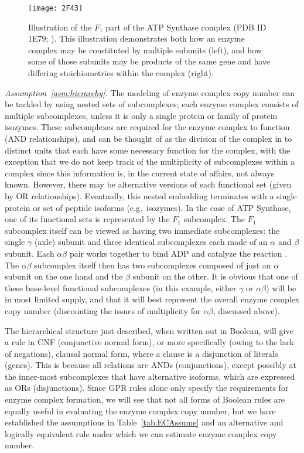 \begin{figure*}%
\centering
\texttt{[image: 2F43]}
\caption{Illustration of the $F_1$ part of the ATP Synthase complex
  (PDB ID 1E79; \citealt{Gibbons2000,Bernstein1978,Gezelter}).
  This illustration demonstrates both how an enzyme complex may be
  constituted by multiple subunits (left), and how some of those
  subunits may be products of the same gene and have differing
  stoichiometries within the complex (right).}
\label{fig:2F43}
\end{figure*}

\emph{Assumption~\ref{asm:hierarchy}.}
The modeling of enzyme complex copy number can be tackled by using
nested sets of subcomplexes; each enzyme complex consists of multiple
subcomplexes, unless it is only a single protein or family of protein
isozymes.  These subcomplexes are required for the enzyme complex to
function (AND relationships), and can be thought of as the division of
the complex in to distinct units that each have some necessary
function for the complex, with the exception that we do not keep track
of the multiplicity of subcomplexes within a complex since this
information is, in the current state of affairs, not always known.
However, there may be alternative versions of each functional set
(given by OR relationships). Eventually, this nested embedding
terminates with a single protein or set of peptide isoforms
(e.g.\ isozymes).  In the case of ATP Synthase, one of its functional
sets is represented by the $F_1$ subcomplex. The $F_1$ subcomplex
itself can be viewed as having two immediate subcomplexes: the single
$\gamma$ (axle) subunit and three identical subcomplexes each made of
an $\alpha$ and $\beta$ subunit. Each $\alpha\beta$ pair works
together to bind ADP and catalyze the reaction \citep{Oster2003}. The
$\alpha\beta$ subcomplex itself then has two subcomplexes composed of
just an $\alpha$ subunit on the one hand and the $\beta$ subunit on
the other.  It is obvious that one of these base-level functional
subcomplexes (in this example, either $\gamma$ or $\alpha\beta$) will
be in most limited supply, and that it will best represent the overall
enzyme complex copy number (discounting the issues of multiplicity for
$\alpha\beta$, discussed above).

%
%

The hierarchical structure just described, when written out in
Boolean, will give a rule in CNF (conjunctive normal form), or more
specifically (owing to the lack of negations), clausal normal form,
where a clause is a disjunction of literals (genes). This is because all
relations are ANDs (conjunctions), except possibly at the inner-most
subcomplexes that have alternative isoforms, which are expressed as
ORs (disjunctions). Since GPR rules alone only specify the
requirements for enzyme complex formation, we will see that not all
forms of Boolean rules are equally useful in evaluating the enzyme
complex copy number, but we have established the assumptions in
Table~\ref{tab:ECAssume} and an alternative and logically equivalent rule
\citep{Russell2009} under which we can estimate enzyme complex copy
number.

